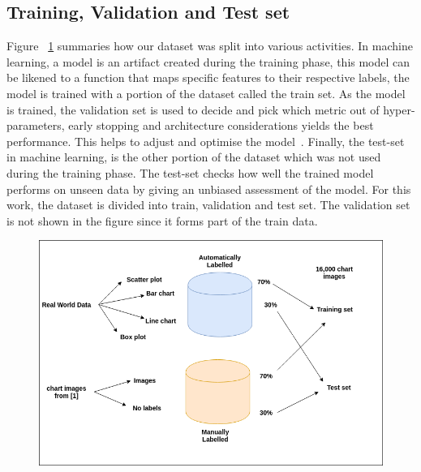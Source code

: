 \documentclass[12pt, a4paper,oneside]{report}
\begin{document}
\subsection{Training, Validation and Test set}
Figure ~\ref{fig:approach} summaries how our dataset was split into various activities. In machine learning, a model is an artifact created during the training phase, this model can be likened to a function that maps specific features to their respective labels, the model is trained with a portion of the dataset called the train set. As the model is trained, the validation set is used to decide and pick which metric out of hyper-parameters, early stopping and architecture considerations yields the best performance. This helps to adjust and optimise the model~\cite{validation}. Finally, the test-set in machine learning, is the other portion of the dataset which was not used during the training phase. The test-set checks how well the trained model performs on unseen data by giving an unbiased assessment of the model. For this work, the dataset is divided into train, validation and test set. The validation set is not shown in the figure since it forms part of the train data.

\begin{figure}[!htbp]
\includegraphics [scale=0.5] {approach}
\label{fig:approach}
\end{figure}
\end{document}
